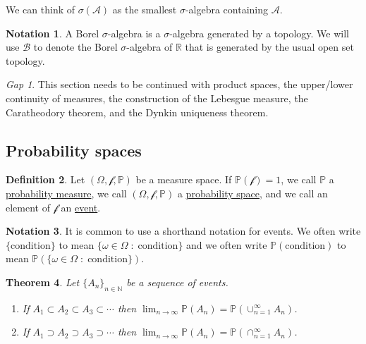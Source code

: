 \documentclass[11pt]{article}
\newcommand{\col}[1]{\mathscr{#1}}
\newcommand{\p}{\mathbb{P}}
\newcommand{\bor}{\col{B}}
\newcommand{\defname}[1]{\underline{#1}}
\newcommand{\NN}{\mathbb{N}}
\newcommand{\RR}{\mathbb{R}}
\theoremstyle{theorem}
\newtheorem{theorem}{Theorem}[section]
\theoremstyle{definition}
\newtheorem{definition}[theorem]{Definition}
\newtheorem{notation}[theorem]{Notation}
\theoremstyle{remark}
\theoremstyle{step}
\theoremstyle{gap}
\newtheorem*{gap}{Gap}
\begin{document}
We can think of \(\sigma(\col{A})\) as the smallest \(\sigma\)-algebra containing \(\col{A}\).

\begin{notation}
A Borel \(\sigma\)-algebra is a \(\sigma\)-algebra generated by a topology. We will use \(\bor\) to denote the Borel \(\sigma\)-algebra of \(\RR\) that is generated by the usual open set topology.
\end{notation}

\begin{gap} This section needs to be continued with product spaces, the upper/lower continuity of measures, the construction of the Lebesgue measure, the Caratheodory theorem, and the Dynkin uniqueness theorem.\end{gap}

\subsection{Probability spaces}

\begin{definition}
Let \((\Omega, \col{f}, \p)\) be a measure space. If \(\p(\col{f}) = 1\), we call \(\p\) a \defname{probability measure}, we call \((\Omega, \col{f}, \p)\) a \defname{probability space}, and we call an element of \(\col{f}\) an \defname{event}.
\end{definition}

\begin{notation}
It is common to use a shorthand notation for events. We often write \(\{\text{condition}\}\) to mean \(\{\omega \in \Omega\;:\;\text{condition}\}\) and we often write \(\p(\text{condition})\) to mean \(\p\left(\{\omega \in \Omega\;:\;\text{condition}\}\right)\).
\end{notation}

\begin{theorem}\label{thm.nestedconvergence}
Let \(\{A_n\}_{n \in \NN}\) be a sequence of events.
\begin{enumerate}
\item
If \(A_1 \subset A_2 \subset A_3 \subset \cdots\) then \(\lim_{n \to \infty} \p(A_n) = \p\left(\cup_{n=1}^\infty A_n\right)\).
\item
If \(A_1 \supset A_2 \supset A_3 \supset \cdots\) then \(\lim_{n \to \infty} \p(A_n) = \p\left(\cap_{n=1}^\infty A_n\right)\).
\end{enumerate}
\end{theorem}
\end{document}
